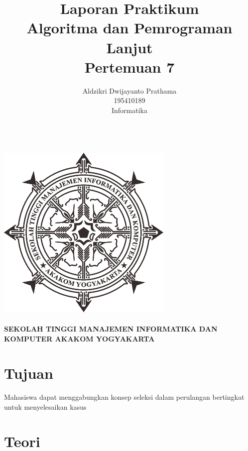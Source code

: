 \documentclass[a4paper,12pt]{article}
\begin{document}
\title{ {\Large Laporan Praktikum}\\ Algoritma dan Pemrograman Lanjut\\{\Large Pertemuan 7}}

\author{Aldzikri Dwijayanto Prathama
    \\195410189
    \\Informatika}
\makeatletter
\begin{titlepage}
    \begin{center}
        {\huge \bfseries \@title}\\[14ex]
        \includegraphics[scale=.8]{logo}\\[4ex]
        {\large \@author}\\[12ex]
        {\large \bfseries {SEKOLAH TINGGI MANAJEMEN INFORMATIKA DAN KOMPUTER
            AKAKOM YOGYAKARTA}}
    \end{center}


\end{titlepage}
\makeatother
\newpage
\tableofcontents
\newpage

\section{Tujuan}
\paragraph{}
Mahasiswa dapat menggabungkan konsep seleksi dalam perulangan bertingkat untuk menyelesaikan kasus


\section{Teori}
\end{document}
